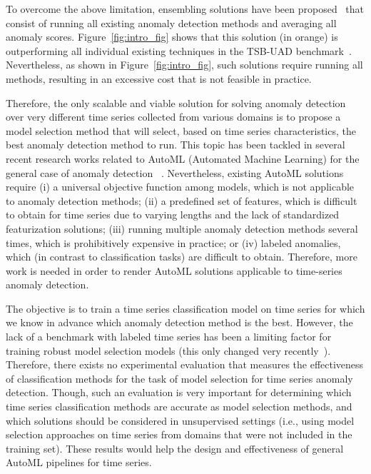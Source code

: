 To overcome the above limitation, ensembling solutions have been proposed~\cite{10.1145/2830544.2830549} that consist of running all existing anomaly detection methods and averaging all anomaly scores. Figure~\ref{fig:intro_fig} shows that this solution (in orange) is outperforming all individual existing techniques in the TSB-UAD benchmark~\cite{10.14778/3529337.3529354,boniol2022theseus}. Nevertheless, as shown in Figure~\ref{fig:intro_fig}, such solutions require running all methods, resulting in an excessive cost that is not feasible in practice.

Therefore, the only scalable and viable solution for solving anomaly detection over very different time series collected from various domains is to propose a model selection method that will select, based on time series characteristics, the best anomaly detection method to run. This topic has been tackled in several recent research works related to AutoML (Automated Machine Learning) for the general case of anomaly detection~\cite{NEURIPS2021_23c89427,ying2020automated} . Nevertheless, existing AutoML solutions require (i) a universal objective function among models, which is not applicable to anomaly detection methods; (ii) a predefined set of features, which is difficult to obtain for time series due to varying lengths and the lack of standardized featurization solutions; (iii) running multiple anomaly detection methods several times, which is prohibitively expensive in practice; or (iv) labeled anomalies, which (in contrast to classification tasks) are difficult to obtain. Therefore, more work is needed in order to render AutoML solutions applicable to time-series anomaly detection. 

The objective is to train a time series classification model on time series for which we know in advance which anomaly detection method is the best. However, the lack of a benchmark with labeled time series has been a limiting factor for training robust model selection models (this only changed very recently~\cite{10.14778/3529337.3529354,10.14778/3538598.3538602,kdd21}). Therefore, there exists no experimental evaluation that measures the effectiveness of classification methods for the task of model selection for time series anomaly detection. Though, such an evaluation is very important for determining which time series classification methods are accurate as model selection methods, and which solutions should be considered in unsupervised settings (i.e., using model selection approaches on time series from domains that were not included in the training set). These results would help the design and effectiveness of general AutoML pipelines for time series.

